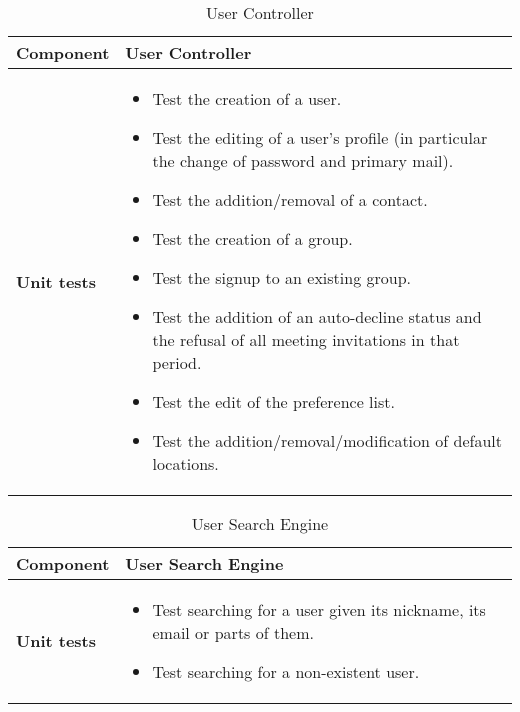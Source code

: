 \begin{table}[h]	
	\centering
	\def\arraystretch{1.5}
	\begin{tabular}{|m{4cm}|m{12cm}|}
		\hline
		\textbf{Component} & User Controller \\ \hline
		\textbf{Unit tests} & 
			\begin{itemize}
			\item Test the creation of a user.
			\item Test the editing of a user's profile (in particular the change of password and primary mail).
			\item Test the addition/removal of a contact.
			\item Test the creation of a group.
			\item Test the signup to an existing group.
			\item Test the addition of an auto-decline status and the refusal of all meeting invitations in that period.
			\item Test the edit of the preference list.
			\item Test the addition/removal/modification of default locations.
			\end{itemize} \\ \hline
	\end{tabular}
	\caption{User Controller}
\end{table}

\begin{table}[h]	
	\centering
	\def\arraystretch{1.5}
	\begin{tabular}{|m{4cm}|m{12cm}|}
		\hline
		\textbf{Component} & User Search Engine \\ \hline
		\textbf{Unit tests} & 
			\begin{itemize}
			\item Test searching for a user given its nickname, its email or parts of them.
			\item Test searching for a non-existent user.
			\end{itemize} \\ \hline
	\end{tabular}
	\caption{User Search Engine}
\end{table}

